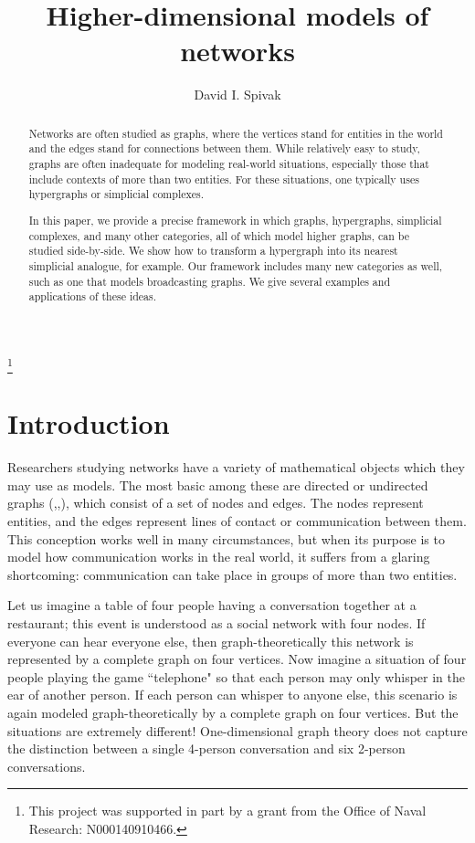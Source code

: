 \documentclass{amsart}
\begin{document}
\begin{abstract}

Networks are often studied as graphs, where the vertices stand for entities in the world and the edges stand for connections between them.  While relatively easy to study, graphs are often inadequate for modeling real-world situations, especially those that include contexts of more than two entities.  For these situations, one typically uses hypergraphs or simplicial complexes.

In this paper, we provide a precise framework in which graphs, hypergraphs, simplicial complexes, and many other categories, all of which model higher graphs, can be studied side-by-side.  We show how to transform a hypergraph into its nearest simplicial analogue, for example.  Our framework includes many new categories as well, such as one that models broadcasting graphs.  We give several examples and applications of these ideas.

\end{abstract}

\author{David I. Spivak}

\title{Higher-dimensional models of networks}

\thanks{This project was supported in part by a grant from the Office of Naval Research: N000140910466.}

\maketitle

\tableofcontents

\section{Introduction}\label{sec:intro}

Researchers studying networks have a variety of mathematical objects which they may use as models.  The most basic among these are directed or undirected graphs (\cite{Bro},\cite{Bol},\cite{Jac}), which consist of a set of nodes and edges.  The nodes represent entities, and the edges represent lines of contact or communication between them.  This conception works well in many circumstances, but when its purpose is to model how communication works in the real world, it suffers from a glaring shortcoming: communication can take place in groups of more than two entities.  

Let us imagine a table of four people having a conversation together at a restaurant; this event is understood as a social network with four nodes.  If everyone can hear everyone else, then graph-theoretically this network is represented by a complete graph on four vertices.  Now imagine a situation of four people playing the game ``telephone" so that each person may only whisper in the ear of another person.  If each person can whisper to anyone else, this scenario is again modeled graph-theoretically by a complete graph on four vertices.  But the situations are extremely different!  One-dimensional graph theory does not capture the distinction between a single 4-person conversation and six 2-person conversations. 
\end{document}
